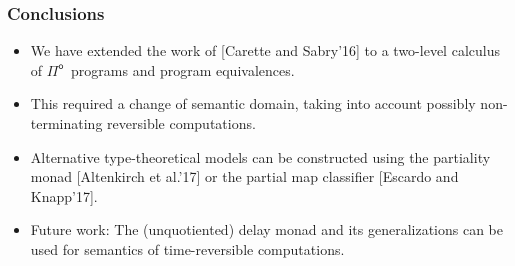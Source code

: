 \documentclass[12pt,t]{beamer}
\newcommand{\Pio}{\ensuremath{\mathsf{\Pi}^{\mathsf{o}}}}
\newcommand{\Set}{\mathsf{Set}}
\begin{document}
\begin{frame}
  \frametitle{Conclusions}
  \begin{itemize}
  \item We have extended the work of [Carette and Sabry'16] to a
    two-level calculus of \Pio\ programs and program equivalences.
    \item This required a change of semantic domain, taking into
      account possibly non-terminating reversible computations.
    \item Alternative type-theoretical models can be constructed using
      the partiality monad [Altenkirch et al.'17] or the partial map
      classifier [Escardo and Knapp'17].
    \item Future work: The (unquotiented) delay monad and its
      generalizations can be used for semantics of
      time-reversible computations.
      
      
  \end{itemize}
\end{frame}

\end{document}
